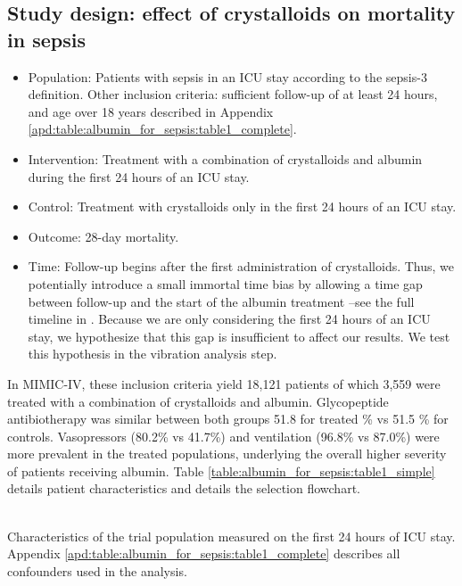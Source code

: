 \documentclass[10pt,letterpaper]{article}
\begin{document}
\subsection*{Study design: effect of crystalloids on mortality in sepsis}%
\label{sec:framing_mimic_iv}

\begin{itemize}[leftmargin=2ex]
  \item \textcolor{P}{Population}: Patients with sepsis in an ICU stay
        according to the sepsis-3 definition. Other inclusion criteria:
        sufficient follow-up of at least 24 hours, and age over 18 years
        described in Appendix \ref{apd:table:albumin_for_sepsis:table1_complete}.

  \item \textcolor{I}{Intervention}: Treatment with a combination of
        crystalloids and albumin during the first 24 hours of an ICU stay.

  \item \textcolor{C}{Control}: Treatment with crystalloids only in the first 24
        hours of an ICU stay.

  \item \textcolor{O}{Outcome}: 28-day mortality.

  \item \textcolor{T}{Time}: Follow-up begins after the first administration of
        crystalloids. Thus, we potentially introduce a small immortal time bias
        by allowing a time gap between follow-up and the start of the albumin
        treatment --see the full timeline in . Because
        we are only considering the first 24 hours of an ICU stay, we
        hypothesize that this gap is insufficient to affect our results. We test
        this hypothesis in the vibration analysis step.
\end{itemize}

In MIMIC-IV, these inclusion criteria yield 18,121 patients of which 3,559 were
treated with a combination of crystalloids and albumin. Glycopeptide antibiotherapy was similar between both groups 51.8 for treated \% vs 51.5 \% for controls. Vasopressors (80.2\% vs 41.7\%) and ventilation (96.8\% vs 87.0\%) were more prevalent in the treated populations, underlying the overall higher severity of patients receiving albumin.
Table \ref{table:albumin_for_sepsis:table1_simple} details
patient characteristics and  details the selection flowchart.


\begin{table}[h!]
  \centering\small
  \resizebox{\columnwidth}{!}{
  }
  \\[.5ex]

  \caption{Characteristics of the trial population measured on the first 24
    hours of ICU stay. Appendix \ref{apd:table:albumin_for_sepsis:table1_complete}
    describes all confounders used in the analysis.}\label{table:albumin_for_sepsis:table1_simple}
\end{table}
\end{document}
